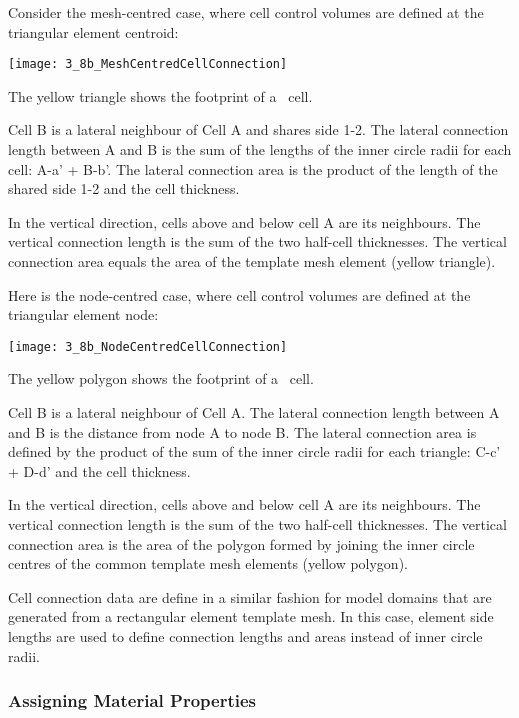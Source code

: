 {Consider the mesh-centred case, where cell control volumes are defined at the triangular element centroid:

        \texttt{[image: 3\_8b\_MeshCentredCellConnection]}

The yellow triangle shows the footprint of a \mfus\ cell.

Cell B is a lateral neighbour of Cell A and shares side 1-2.  The lateral connection length between A and B is the sum of the lengths of the inner circle radii for each cell: A-a' + B-b'.  The lateral connection area is the product of the length of the shared side 1-2 and the cell thickness.

In the vertical direction, cells above and below cell A are its neighbours.  The vertical connection length is the sum of the two half-cell thicknesses. The vertical connection area equals the area of the template mesh element (yellow triangle).

Here is the node-centred case, where cell control volumes are defined at the triangular element node:

        \texttt{[image: 3\_8b\_NodeCentredCellConnection]}

The yellow polygon shows the footprint of a \mfus\ cell.

Cell B is a lateral neighbour of Cell A.  The lateral connection length between A and B is the distance from node A to node B. The lateral connection area is defined by the product of the sum of the inner circle radii for each triangle: C-c' + D-d' and the cell thickness.

In the vertical direction, cells above and below cell A are its neighbours.  The vertical connection length is the sum of the two half-cell thicknesses. The vertical connection area is the area of the polygon formed by joining the inner circle centres of the common template mesh elements (yellow polygon).

Cell connection data are define in a similar fashion for model domains that are generated from a rectangular element template mesh.  In this case, element side lengths are used to define connection lengths and areas instead of inner circle radii.


\subsubsection{Assigning Material Properties}   \label{section:matprops}

}
